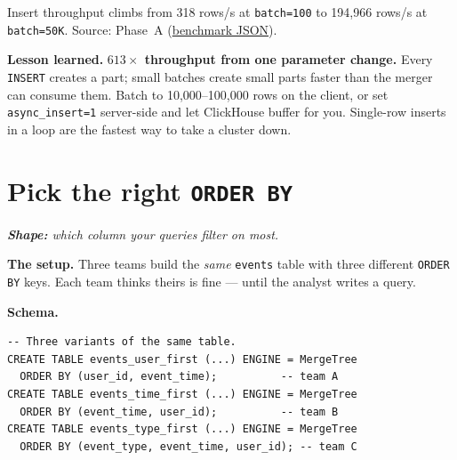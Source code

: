 \documentclass[11pt]{article}
\newcommand{\shape}[1]{%
  \par\noindent\textit{\textbf{Shape:} #1}\par\smallskip}
\newcommand{\schemaHd}{%
  \par\smallskip\noindent\textbf{\color{accentblue}Schema.}\par\nopagebreak\smallskip}
\newcommand{\lesson}[1]{%
  \par\medskip
  \begin{lessonbox}\textbf{\color{accentgreen}Lesson learned.}\enspace #1\end{lessonbox}}
\begin{document}
\begin{figure}[ht]
\centering
{}
\end{figure}

\vspace{-0.6em}
Insert throughput climbs from 318 rows/s at \texttt{batch=100} to
194{,}966 rows/s at \texttt{batch=50K}.
Source: Phase~A
(\href{run:results/benchmark_20260503_191546.json}{benchmark JSON}).

\lesson{%
\textbf{$613\times$ throughput from one parameter change.}
Every \texttt{INSERT} creates a part; small batches create small parts
faster than the merger can consume them.
Batch to 10{,}000--100{,}000 rows on the client, or set
\texttt{async\_insert=1} server-side and let ClickHouse buffer for you.
Single-row inserts in a loop are the fastest way to take a cluster down.}

\section{Pick the right \texttt{ORDER BY}}

\shape{which column your queries filter on most.}

\textbf{The setup.}
Three teams build the \emph{same} \texttt{events} table with three
different \texttt{ORDER BY} keys. Each team thinks theirs is fine — until
the analyst writes a query.

\schemaHd
\begin{lstlisting}
-- Three variants of the same table.
CREATE TABLE events_user_first (...) ENGINE = MergeTree
  ORDER BY (user_id, event_time);          -- team A
CREATE TABLE events_time_first (...) ENGINE = MergeTree
  ORDER BY (event_time, user_id);          -- team B
CREATE TABLE events_type_first (...) ENGINE = MergeTree
  ORDER BY (event_type, event_time, user_id); -- team C
\end{lstlisting}
\end{document}
